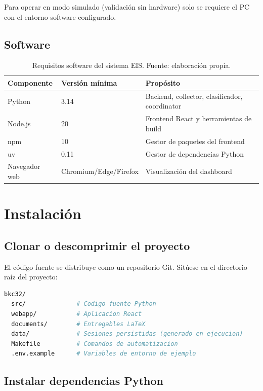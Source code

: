 \documentclass[11pt,a4paper,spanish]{book}
\begin{document}
Para operar en modo simulado (validaci\'{o}n sin hardware) solo se requiere el PC con el entorno software configurado.

\section{Software}

\begin{table}[ht]
\centering
\begin{tabular}{l l p{7cm}}
\hline\hline
Componente & Versi\'{o}n m\'{i}nima & Prop\'{o}sito \\ [0.5ex]
\hline
Python & 3.14 & Backend, collector, clasificador, coordinator \\
Node.js & 20 & Frontend React y herramientas de build \\
npm & 10 & Gestor de paquetes del frontend \\
uv & 0.11 & Gestor de dependencias Python \\
Navegador web & Chromium/Edge/Firefox & Visualizaci\'{o}n del dashboard \\
\hline
\end{tabular}
\caption[Requisitos software]{Requisitos software del sistema EIS. Fuente: elaboraci\'{o}n propia.}
\label{tab:requisitos-software}
\end{table}

\chapter{Instalaci\'{o}n}

\section{Clonar o descomprimir el proyecto}

El c\'{o}digo fuente se distribuye como un repositorio Git. Sit\'{u}ese en el directorio ra\'{i}z del proyecto:

\begin{lstlisting}[language=bash, caption={Estructura del proyecto}]
bkc32/
  src/              # Codigo fuente Python
  webapp/           # Aplicacion React
  documents/        # Entregables LaTeX
  data/             # Sesiones persistidas (generado en ejecucion)
  Makefile          # Comandos de automatizacion
  .env.example      # Variables de entorno de ejemplo
\end{lstlisting}

\section{Instalar dependencias Python}
\end{document}
